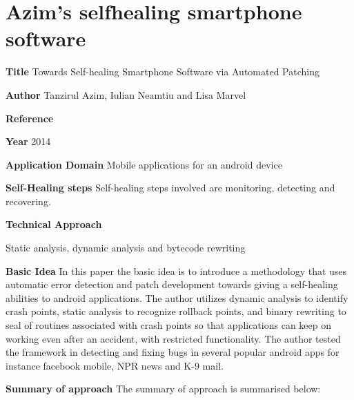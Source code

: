 \section{Azim's selfhealing smartphone software}\label{AzimSelf}
\begin{compactitem}
\item[\textbf{Title}] Towards Self-healing Smartphone Software via Automated Patching
\item[\textbf{Author}]
Tanzirul Azim, Iulian Neamtiu and Lisa Marvel\item[\textbf{Reference}] 

\cite{tanzirul_azim_smartphone:_2014}

\item[\textbf{Year}] 2014

\item[\textbf{Application Domain}]
Mobile applications for an android device

\item[\textbf{Self-Healing steps}] Self-healing steps involved are monitoring, detecting and recovering.

\item[\textbf{Technical Approach}]

Static analysis, dynamic analysis and bytecode rewriting

\item[\textbf{Basic Idea}]  
In this paper the basic idea is to introduce a methodology that uses automatic error detection and patch development towards giving a self-healing abilities to android applications. The author utilizes dynamic analysis to identify crash points, static analysis to recognize rollback points, and binary rewriting to seal of routines associated with crash points so that applications can keep on working even after an accident, with restricted functionality. The author tested the framework in detecting and fixing bugs in several popular android apps for instance facebook mobile, NPR news and K-9 mail. 

\item[\textbf{Summary of approach}] 
The summary of approach is summarised below:


\end{compactitem}
